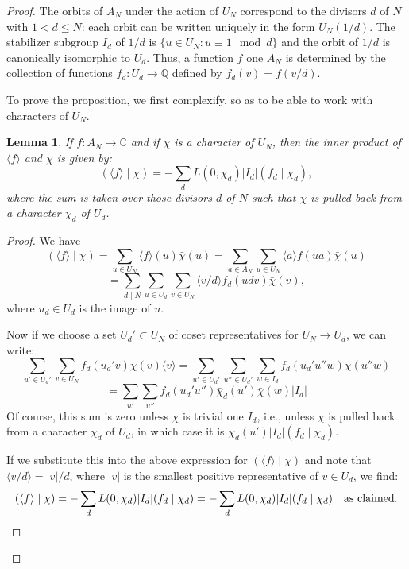 \documentclass[12pt,a4paper]{article}
\theoremstyle{plain}
\newtheorem{lemma}[theorem]{Lemma}
\theoremstyle{definition}
\theoremstyle{remark}
\newcommand{\Q}{\mathbb{Q}}
\newcommand{\C}{\mathbb{C}}
\begin{document}
\begin{proof}
The orbits of $A_N$ under the action of $U_N$ correspond to the divisors $d$ of
$N$ with $1 < d \leq N$: each orbit can be written uniquely in the form
$U_N(1/d)$. The stabilizer subgroup $I_d$ of $1/d$ is
$\{u \in U_N: u \equiv 1 \mod d\}$ and the orbit of $1/d$ is canonically
isomorphic to $U_d$. Thus, a function $f$ one $A_N$ is determined by the collection
of functions $f_d: U_d \to \Q$ defined by $f_d(v) = f(v/d)$.

To prove the proposition, we first complexify, so as to be able to work with
characters of $U_N$.

\begin{lemma}
If $f: A_N \to \C$ and if $\chi$ is a character of $U_N$, then the inner product of
$\langle f \rangle$ and $\chi$ is given by:
\[
(\langle f \rangle \mid \chi) = -\sum_d L(0, \chi_d) |I_d| (f_d \mid \chi_d),
\]
where the sum is taken over those divisors $d$ of $N$ such that $\chi$ is pulled
back from a character $\chi_d$ of $U_d$.
\end{lemma}

\begin{proof}
We have
\[
(\langle f \rangle \mid \chi) = \sum_{u \in U_N} \langle f \rangle(u) \bar{\chi}(u)
= \sum_{a \in A_N} \sum_{u \in U_N} \langle a \rangle f(ua) \bar{\chi}(u)
\]
\[
= \sum_{d \mid N} \sum_{u \in U_d} \sum_{v \in U_N} \langle v/d \rangle f_d(udv) \bar{\chi}(v),
\]
where $u_d \in U_d$ is the image of $u$.

Now if we choose a set $U_d' \subset U_N$ of coset representatives for
$U_N \to U_d$, we can write:
\[
\sum_{u' \in U_d'} \sum_{v \in U_N} f_d(u_d' v) \bar{\chi}(v) \langle v \rangle
= \sum_{u' \in U_d'} \sum_{u'' \in U_d'} \sum_{w \in I_d} f_d(u_d' u'' w) \bar{\chi}(u'' w)
\]
\[
= \sum_{u'} \sum_{u''} f_d(u_d' u'') \bar{\chi}_d(u') \bar{\chi}(w) |I_d|
\]
Of course, this sum is zero unless $\chi$ is trivial one $I_d$, i.e., unless $\chi$ is pulled
back from a character $\chi_d$ of $U_d$, in which case it is
$\chi_d(u') |I_d| (f_d \mid \chi_d)$.

If we substitute this into the above expression for $(\langle f \rangle \mid \chi)$ and
note that $\langle v/d \rangle = |v|/d$, where $|v|$ is the smallest positive representative
of $v \in U_d$, we find:
\[
(\langle f \rangle \mid \chi) = -\sum_d L(0, \chi_d) |I_d| (f_d \mid \chi_d)
= -\sum_d L(0, \chi_d) |I_d| (f_d \mid \chi_d) \quad \text{as claimed.} \qedhere
\]
\end{proof}


\end{proof}
\end{document}
